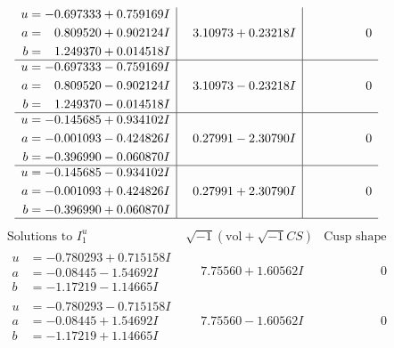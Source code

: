 \documentclass[1p]{elsarticle_modified}
\theoremstyle{definition}
\newcommand{\I}{\sqrt{-1}}
\begin{document}
$$\begin{array}{c|c|c}
\begin{aligned}
u &= -0.697333 + 0.759169 I \\
a &= \phantom{-}0.809520 + 0.902124 I \\
b &= \phantom{-}1.249370 + 0.014518 I\end{aligned}
 & \phantom{-}3.10973 + 0.23218 I & \phantom{-0.000000 } 0 \\ \hline\begin{aligned}
u &= -0.697333 - 0.759169 I \\
a &= \phantom{-}0.809520 - 0.902124 I \\
b &= \phantom{-}1.249370 - 0.014518 I\end{aligned}
 & \phantom{-}3.10973 - 0.23218 I & \phantom{-0.000000 } 0 \\ \hline\begin{aligned}
u &= -0.145685 + 0.934102 I \\
a &= -0.001093 - 0.424826 I \\
b &= -0.396990 - 0.060870 I\end{aligned}
 & \phantom{-}0.27991 - 2.30790 I & \phantom{-0.000000 } 0 \\ \hline\begin{aligned}
u &= -0.145685 - 0.934102 I \\
a &= -0.001093 + 0.424826 I \\
b &= -0.396990 + 0.060870 I\end{aligned}
 & \phantom{-}0.27991 + 2.30790 I & \phantom{-0.000000 } 0\\
 \hline 
 \end{array}$$\newpage$$\begin{array}{c|c|c}  
\text{Solutions to }I^u_{1}& \I (\text{vol} + \sqrt{-1}CS) & \text{Cusp shape}\\
 \hline 
\begin{aligned}
u &= -0.780293 + 0.715158 I \\
a &= -0.08445 - 1.54692 I \\
b &= -1.17219 - 1.14665 I\end{aligned}
 & \phantom{-}7.75560 + 1.60562 I & \phantom{-0.000000 } 0 \\ \hline\begin{aligned}
u &= -0.780293 - 0.715158 I \\
a &= -0.08445 + 1.54692 I \\
b &= -1.17219 + 1.14665 I\end{aligned}
 & \phantom{-}7.75560 - 1.60562 I & \phantom{-0.000000 } 0 \\ \hline\begin{aligned}

\end{aligned}
\end{array}$$
\end{document}
